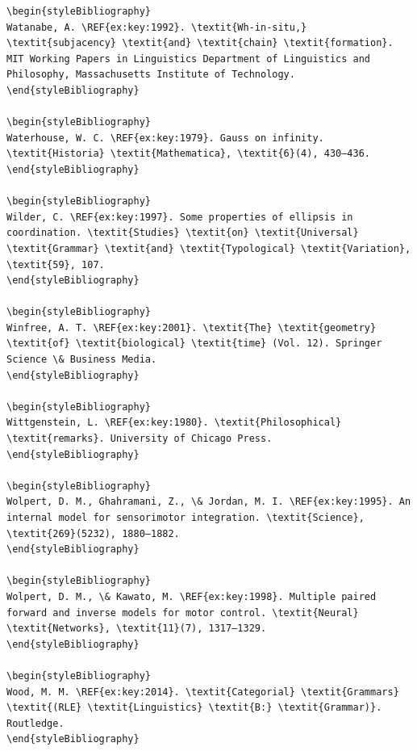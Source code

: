 \begin{verbatim}
\begin{styleBibliography}
Watanabe, A. \REF{ex:key:1992}. \textit{Wh-in-situ,} \textit{subjacency} \textit{and} \textit{chain} \textit{formation}. MIT Working Papers in Linguistics Department of Linguistics and Philosophy, Massachusetts Institute of Technology.
\end{styleBibliography}

\begin{styleBibliography}
Waterhouse, W. C. \REF{ex:key:1979}. Gauss on infinity. \textit{Historia} \textit{Mathematica}, \textit{6}(4), 430–436.
\end{styleBibliography}

\begin{styleBibliography}
Wilder, C. \REF{ex:key:1997}. Some properties of ellipsis in coordination. \textit{Studies} \textit{on} \textit{Universal} \textit{Grammar} \textit{and} \textit{Typological} \textit{Variation}, \textit{59}, 107.
\end{styleBibliography}

\begin{styleBibliography}
Winfree, A. T. \REF{ex:key:2001}. \textit{The} \textit{geometry} \textit{of} \textit{biological} \textit{time} (Vol. 12). Springer Science \& Business Media.
\end{styleBibliography}

\begin{styleBibliography}
Wittgenstein, L. \REF{ex:key:1980}. \textit{Philosophical} \textit{remarks}. University of Chicago Press.
\end{styleBibliography}

\begin{styleBibliography}
Wolpert, D. M., Ghahramani, Z., \& Jordan, M. I. \REF{ex:key:1995}. An internal model for sensorimotor integration. \textit{Science}, \textit{269}(5232), 1880–1882.
\end{styleBibliography}

\begin{styleBibliography}
Wolpert, D. M., \& Kawato, M. \REF{ex:key:1998}. Multiple paired forward and inverse models for motor control. \textit{Neural} \textit{Networks}, \textit{11}(7), 1317–1329.
\end{styleBibliography}

\begin{styleBibliography}
Wood, M. M. \REF{ex:key:2014}. \textit{Categorial} \textit{Grammars} \textit{(RLE} \textit{Linguistics} \textit{B:} \textit{Grammar)}. Routledge.
\end{styleBibliography}


\end{verbatim}
